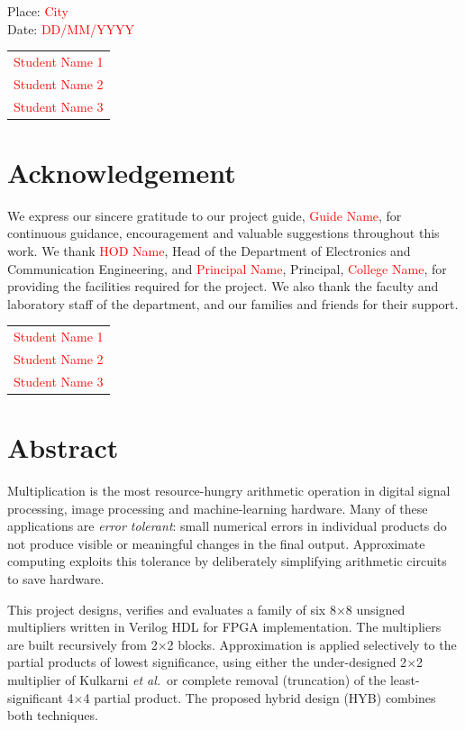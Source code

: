 \documentclass[12pt,a4paper,oneside]{report}
\newcommand{\placeholder}[1]{\textcolor{red}{#1}}
\begin{document}
\vspace{2cm}
\noindent Place: \placeholder{City}\\
Date: \placeholder{DD/MM/YYYY}
\hfill
\begin{tabular}{r}
\placeholder{Student Name 1} \\ \placeholder{Student Name 2} \\ \placeholder{Student Name 3}
\end{tabular}

\chapter*{Acknowledgement}
We express our sincere gratitude to our project guide, \placeholder{Guide Name}, for continuous guidance, encouragement and valuable suggestions throughout this work. We thank \placeholder{HOD Name}, Head of the Department of Electronics and Communication Engineering, and \placeholder{Principal Name}, Principal, \placeholder{College Name}, for providing the facilities required for the project. We also thank the faculty and laboratory staff of the department, and our families and friends for their support.

\vspace{1.5cm}
\hfill
\begin{tabular}{r}
\placeholder{Student Name 1} \\ \placeholder{Student Name 2} \\ \placeholder{Student Name 3}
\end{tabular}

\chapter*{Abstract}
Multiplication is the most resource-hungry arithmetic operation in digital signal processing, image processing and machine-learning hardware. Many of these applications are \emph{error tolerant}: small numerical errors in individual products do not produce visible or meaningful changes in the final output. Approximate computing exploits this tolerance by deliberately simplifying arithmetic circuits to save hardware.

This project designs, verifies and evaluates a family of six 8$\times$8 unsigned multipliers written in Verilog HDL for FPGA implementation. The multipliers are built recursively from 2$\times$2 blocks. Approximation is applied selectively to the partial products of lowest significance, using either the under-designed 2$\times$2 multiplier of Kulkarni \emph{et al.}\ or complete removal (truncation) of the least-significant 4$\times$4 partial product. The proposed hybrid design (HYB) combines both techniques.
\end{document}
